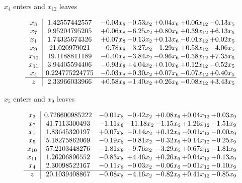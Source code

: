 \documentclass[8pt]{article}
\begin{document}
 $ x_{4} $ enters and $ x_{12} $ leaves 

 \[\begin{array}{c| c c@{\hskip 2pt} c@{\hskip 2pt} c@{\hskip 2pt} c@{\hskip 2pt} c@{\hskip 2pt} }
 x_{3}   &  1.42557442557 & -0.03 x_{8} & -0.53 x_{2} & +  0.04 x_{6} & +  0.06 x_{12} & -0.13 x_{5}\\
 x_{7}   &  9.95204795205 & +  0.06 x_{8} & -6.25 x_{2} & +  0.80 x_{6} & +  0.39 x_{12} & +  6.13 x_{5}\\
 x_{1}   &  1.74325674326 & +  0.07 x_{8} & -0.13 x_{2} & +  0.13 x_{6} & -0.01 x_{12} & +  0.02 x_{5}\\
 x_{9}   &  21.020979021 & -0.78 x_{8} & -3.27 x_{2} & -1.29 x_{6} & +  0.58 x_{12} & -4.06 x_{5}\\
 x_{10}   &  19.1188811189 & -0.40 x_{8} & -3.84 x_{2} & -0.96 x_{6} & -0.38 x_{12} & +  7.35 x_{5}\\
 x_{11}   &  3.94405594406 & -0.93 x_{8} & +  4.04 x_{2} & +  0.10 x_{6} & +  0.12 x_{12} & -0.52 x_{5}\\
 x_{4}   &  0.224775224775 & -0.03 x_{8} & +  0.30 x_{2} & +  0.07 x_{6} & -0.07 x_{12} & +  0.40 x_{5}\\
\hline
z    &  2.33966033966 & +  0.58 x_{8} & -1.40 x_{2} & +  0.26 x_{6} & -0.08 x_{12} & +  3.43 x_{5}\\
\end{array}\]


 $ x_{5} $ enters and $ x_{9} $ leaves 

 \[\begin{array}{c| c c@{\hskip 2pt} c@{\hskip 2pt} c@{\hskip 2pt} c@{\hskip 2pt} c@{\hskip 2pt} }
 x_{3}   &  0.726600985222 & -0.01 x_{8} & -0.42 x_{2} & +  0.08 x_{6} & +  0.04 x_{12} & +  0.03 x_{9}\\
 x_{7}   &  41.7113300493 & -1.11 x_{8} & -11.18 x_{2} & -1.15 x_{6} & +  1.26 x_{12} & -1.51 x_{9}\\
 x_{1}   &  1.83645320197 & +  0.07 x_{8} & -0.14 x_{2} & +  0.12 x_{6} & -0.01 x_{12} & -0.00 x_{9}\\
 x_{5}   &  5.18275862069 & -0.19 x_{8} & -0.81 x_{2} & -0.32 x_{6} & +  0.14 x_{12} & -0.25 x_{9}\\
 x_{10}   &  57.2103448276 & -1.81 x_{8} & -9.76 x_{2} & -3.29 x_{6} & +  0.67 x_{12} & -1.81 x_{9}\\
 x_{11}   &  1.26206896552 & -0.83 x_{8} & +  4.46 x_{2} & +  0.26 x_{6} & +  0.04 x_{12} & +  0.13 x_{9}\\
 x_{4}   &  2.30098522167 & -0.11 x_{8} & -0.03 x_{2} & -0.06 x_{6} & -0.01 x_{12} & -0.10 x_{9}\\
\hline
z    &  20.1039408867 & -0.08 x_{8} & -4.16 x_{2} & -0.82 x_{6} & +  0.41 x_{12} & -0.85 x_{9}\\
\end{array}\]
\end{document}
